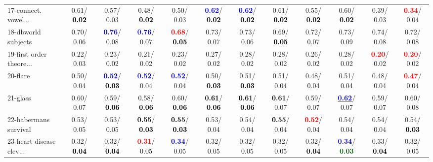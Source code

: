 \begin{table}[h]
\begin{center}
{\begin{tabular}{lc|c|c|c|c|c|c|c|c|c|c}
17-connect. vowel... &   0.61/\textcolor{black}{\textbf{  0.02}} &   0.57/  0.03 &   0.48/\textcolor{black}{\textbf{  0.02}} &   0.50/  0.03 & \textcolor{blue}{\textbf{  0.62}}/\textcolor{black}{\textbf{  0.02}} & \textcolor{blue}{\textbf{  0.62}}/\textcolor{black}{\textbf{  0.02}} &   0.61/\textcolor{black}{\textbf{  0.02}} &   0.55/\textcolor{black}{\textbf{  0.02}} &   0.60/\textcolor{black}{\textbf{  0.02}} &   0.39/  0.03 & \textcolor{red}{\textbf{  0.34}}/  0.04 \\
18-dbworld subjects &   0.70/  0.06 & \textcolor{blue}{\textbf{  0.76}}/  0.08 & \textcolor{blue}{\textbf{  0.76}}/  0.07 & \textcolor{red}{\textbf{  0.68}}/\textcolor{black}{\textbf{  0.05}} &   0.73/  0.07 &   0.73/  0.06 &   0.69/\textcolor{black}{\textbf{  0.05}} &   0.72/  0.07 &   0.73/  0.09 &   0.74/  0.08 &   0.72/  0.08 \\
19-first order theore... &   0.22/  0.03 &   0.23/  0.02 &   0.21/  0.02 &   0.23/  0.02 &   0.27/  0.02 &   0.28/  0.02 &   0.28/  0.02 &   0.26/  0.02 &   0.28/  0.02 & \textcolor{red}{\textbf{  0.20}}/  0.02 & \textcolor{red}{\textbf{  0.20}}/  0.02 \\
20-flare &   0.50/  0.04 & \textcolor{blue}{\textbf{  0.52}}/\textcolor{black}{\textbf{  0.03}} & \textcolor{blue}{\textbf{  0.52}}/  0.04 & \textcolor{blue}{\textbf{  0.52}}/  0.04 &   0.50/\textcolor{black}{\textbf{  0.03}} &   0.51/\textcolor{black}{\textbf{  0.03}} &   0.51/  0.04 &   0.48/  0.04 &   0.51/  0.04 &   0.48/  0.04 & \textcolor{red}{\textbf{  0.47}}/  0.04 \\
21-glass &   0.60/  0.07 &   0.59/\textcolor{black}{\textbf{  0.06}} &   0.58/\textcolor{black}{\textbf{  0.06}} &   0.60/\textcolor{black}{\textbf{  0.06}} & \textcolor{black}{\textbf{  0.61}}/\textcolor{black}{\textbf{  0.06}} & \textcolor{black}{\textbf{  0.61}}/\textcolor{black}{\textbf{  0.06}} & \textcolor{black}{\textbf{  0.61}}/  0.07 &   0.59/  0.07 & \underline{\textcolor{blue}{\textbf{  0.62}}}/  0.07 &   0.59/  0.07 &   0.60/  0.08 \\ \hline
22-habermans survival &   0.53/  0.05 &   0.53/  0.05 & \textcolor{black}{\textbf{  0.55}}/\textcolor{black}{\textbf{  0.03}} & \textcolor{black}{\textbf{  0.55}}/\textcolor{black}{\textbf{  0.03}} &   0.53/  0.04 &   0.54/  0.04 & \textcolor{black}{\textbf{  0.55}}/  0.04 & \textcolor{red}{\textbf{  0.52}}/  0.04 &   0.54/  0.04 &   0.54/  0.04 &   0.54/\textcolor{black}{\textbf{  0.03}} \\
23-heart disease clev... &   0.32/\textcolor{black}{\textbf{  0.04}} &   0.32/\textcolor{black}{\textbf{  0.04}} & \textcolor{red}{\textbf{  0.31}}/  0.05 & \textcolor{blue}{\textbf{  0.34}}/  0.05 &   0.32/  0.05 &   0.32/  0.05 &   0.32/  0.05 &   0.32/\textcolor{black}{\textbf{  0.04}} & \textcolor{blue}{\textbf{  0.34}}/\textcolor{darkgreen}{\textbf{  0.03}} &   0.33/\textcolor{black}{\textbf{  0.04}} &   0.32/  0.05 \\

\end{tabular}}
\end{center}
\end{table}
